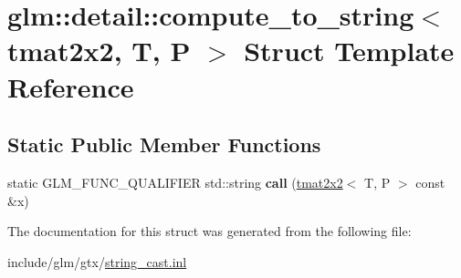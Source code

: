 \hypertarget{structglm_1_1detail_1_1compute__to__string_3_01tmat2x2_00_01T_00_01P_01_4}{}\section{glm\+:\+:detail\+:\+:compute\+\_\+to\+\_\+string$<$ tmat2x2, T, P $>$ Struct Template Reference}
\label{structglm_1_1detail_1_1compute__to__string_3_01tmat2x2_00_01T_00_01P_01_4}
\subsection*{Static Public Member Functions}
\begin{DoxyCompactItemize}
\item 
\mbox{\label{structglm_1_1detail_1_1compute__to__string_3_01tmat2x2_00_01T_00_01P_01_4_a2e35f591c3596c78d4ad73df870dfa10}} 
static G\+L\+M\+\_\+\+F\+U\+N\+C\+\_\+\+Q\+U\+A\+L\+I\+F\+I\+ER std\+::string {\bfseries call} (\hyperlink{structglm_1_1tmat2x2}{tmat2x2}$<$ T, P $>$ const \&x)
\end{DoxyCompactItemize}


The documentation for this struct was generated from the following file\+:\begin{DoxyCompactItemize}
\item 
include/glm/gtx/\hyperlink{string__cast_8inl}{string\+\_\+cast.\+inl}\end{DoxyCompactItemize}
